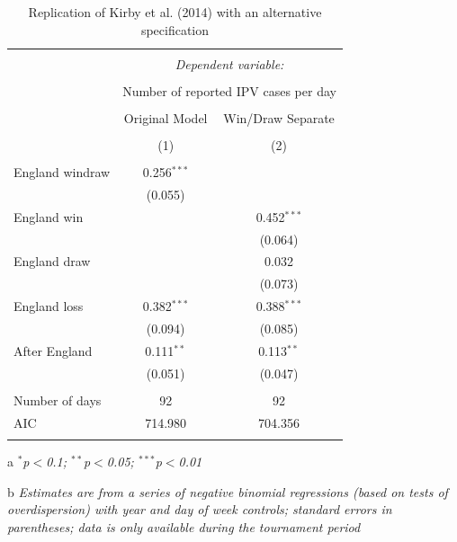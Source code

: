\documentclass[12pt, letterpaper]{article}
\begin{document}
\begin{table}[htp]
\centering
 \caption{Replication of Kirby et al. (2014) with an alternative specification}
   \label{kirbyrep1}
 \begin{threeparttable}
\begin{tabular}{@{\extracolsep{5pt}}lcc} 
\\[-1.8ex]\hline 
\hline \\[-1.8ex] 
 & \multicolumn{2}{c}{\textit{Dependent variable:}} \\ 
\cline{2-3} 
\\[-1.8ex] & \multicolumn{2}{c}{Number of reported IPV cases per day} \\ 
\\ 
 & Original Model & Win/Draw Separate \\ 
\\[-1.8ex] & (1) & (2)\\ 
\hline \\[-1.8ex] 
 England windraw & 0.256$^{***}$ &  \\ 
  & (0.055) &  \\ 
  England win &  & 0.452$^{***}$ \\ 
  &  & (0.064) \\ 
  England draw &  & 0.032 \\ 
  &  & (0.073) \\ 
  England loss & 0.382$^{***}$ & 0.388$^{***}$ \\ 
  & (0.094) & (0.085) \\ 
  After England & 0.111$^{**}$ & 0.113$^{**}$ \\ 
  & (0.051) & (0.047) \\ 
 \hline \\[-1.8ex] 
Number of days & 92 & 92 \\ 
AIC & 714.980 & 704.356 \\ 
\hline \\[-1.8ex] 
\end{tabular} 
\begin{tablenotes}
      \item[a] \textit{$^{*}$p$<$0.1; $^{**}$p$<$0.05; $^{***}$p$<$0.01}
      \item[b] \textit{Estimates are from a series of negative binomial regressions (based on tests of overdispersion) with year and day of week controls; standard errors in parentheses; data is only available during the tournament period}
    \end{tablenotes}
\end{threeparttable} 
\end{table}
\end{document}
